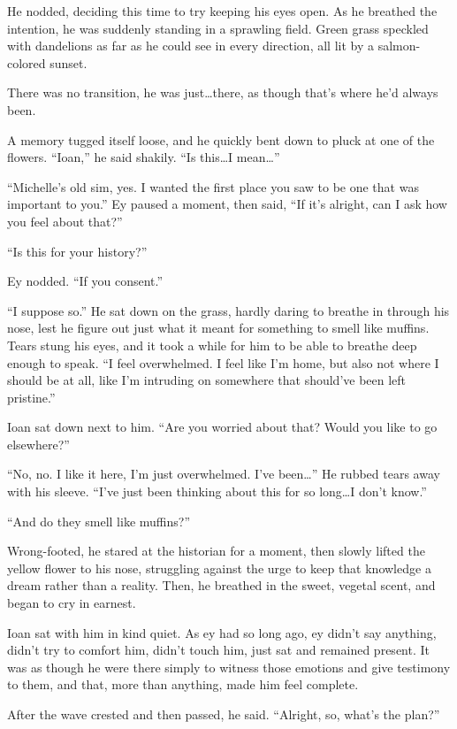 He nodded, deciding this time to try keeping his eyes open. As he breathed the intention, he was suddenly standing in a sprawling field. Green grass speckled with dandelions as far as he could see in every direction, all lit by a salmon-colored sunset.

There was no transition, he was just\ldots there, as though that's where he'd always been.

A memory tugged itself loose, and he quickly bent down to pluck at one of the flowers. ``Ioan,'' he said shakily. ``Is this\ldots I mean\ldots{}''

``Michelle's old sim, yes. I wanted the first place you saw to be one that was important to you.'' Ey paused a moment, then said, ``If it's alright, can I ask how you feel about that?''

``Is this for your history?''

Ey nodded. ``If you consent.''

``I suppose so.'' He sat down on the grass, hardly daring to breathe in through his nose, lest he figure out just what it meant for something to smell like muffins. Tears stung his eyes, and it took a while for him to be able to breathe deep enough to speak. ``I feel overwhelmed. I feel like I'm home, but also not where I should be at all, like I'm intruding on somewhere that should've been left pristine.''

Ioan sat down next to him. ``Are you worried about that? Would you like to go elsewhere?''

``No, no. I like it here, I'm just overwhelmed. I've been\ldots{}'' He rubbed tears away with his sleeve. ``I've just been thinking about this for so long\ldots I don't know.''

``And do they smell like muffins?''

Wrong-footed, he stared at the historian for a moment, then slowly lifted the yellow flower to his nose, struggling against the urge to keep that knowledge a dream rather than a reality. Then, he breathed in the sweet, vegetal scent, and began to cry in earnest.

Ioan sat with him in kind quiet. As ey had so long ago, ey didn't say anything, didn't try to comfort him, didn't touch him, just sat and remained present. It was as though he were there simply to witness those emotions and give testimony to them, and that, more than anything, made him feel complete.

After the wave crested and then passed, he said. ``Alright, so, what's the plan?''

